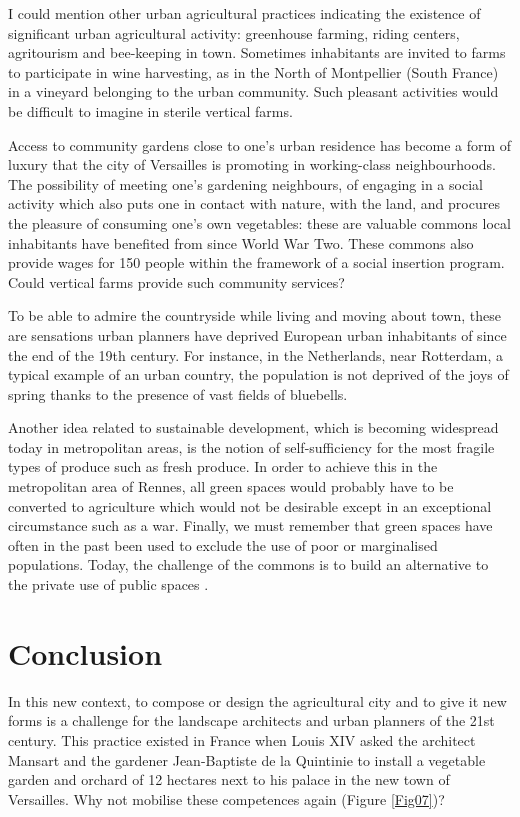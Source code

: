 \documentclass[10pt,a4paper]{article}
\begin{document}
\begin{multicols}{2}
I could mention other urban agricultural practices indicating the existence of significant urban agricultural activity: greenhouse farming, riding centers, agritourism and bee-keeping in town.
Sometimes inhabitants are invited to farms to participate in wine harvesting, as in the North of Montpellier (South France) in a vineyard belonging to the urban community. Such pleasant activities would be difficult to imagine in sterile vertical farms.

Access to community gardens close to one’s urban residence has become a form of luxury that the city of Versailles is promoting in working-class neighbourhoods. The possibility of meeting one’s gardening neighbours, of engaging in a social activity which also puts one in contact with nature, with the land, and procures the pleasure of consuming one's own vegetables: these are valuable commons local inhabitants have benefited from since World War Two. These commons also provide wages for 150 people within the framework of a social insertion program. Could vertical farms provide such community services?

To be able to admire the countryside while living and moving about town, these are sensations urban planners have deprived European urban inhabitants of since the end of the 19th century. For instance, in the Netherlands, near Rotterdam, a typical example of an urban country, the population is not deprived of the joys of spring thanks to the presence of vast fields of bluebells.

Another idea related to sustainable development, which is becoming widespread today in metropolitan areas, is the notion of self-sufficiency for the most fragile types of produce such as fresh produce. In order to achieve this in the metropolitan area of Rennes, all green spaces would probably have to be converted to agriculture which would not be desirable except in an exceptional circumstance such as a war. Finally, we must remember that green spaces have often in the past been used to exclude the use of poor or marginalised populations. Today,  the challenge of the commons is to build an alternative to the private use of public spaces \citep{r08}.

\section{Conclusion}
\noindent In this new context, to compose or design the agricultural city and to give it new forms is a challenge for the landscape architects and urban planners of the 21st century. This practice existed in France when Louis XIV asked the architect Mansart and the gardener Jean-Baptiste de la Quintinie to install a vegetable garden and orchard of 12 hectares next to his palace in the new town of Versailles. Why not mobilise these competences again (Figure \ref{Fig07})?


\end{multicols}
\end{document}
